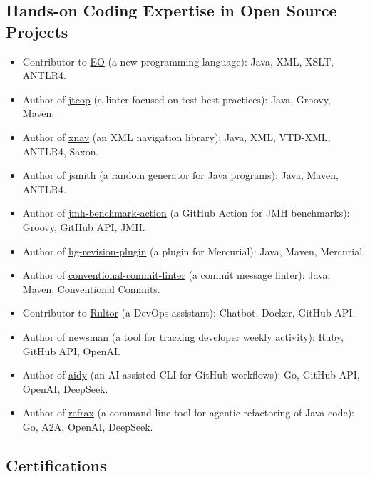 \documentclass{vl}
\begin{document}
\subsection*{Hands-on Coding Expertise in Open Source Projects}
\begin{itemize}
    \itemsep0em
    \item Contributor to \href{https://www.eolang.org}{EO} (a new programming language): Java, XML, XSLT, ANTLR4.
    \item Author of \href{https://github.com/volodya-lombrozo/jtcop}{jtcop} (a linter focused on test best practices): Java, Groovy, Maven.
    \item Author of \href{https://github.com/volodya-lombrozo/xnav}{xnav} (an XML navigation library): Java, XML, VTD-XML, ANTLR4, Saxon.
    \item Author of \href{https://github.com/volodya-lombrozo/jsmith}{jsmith} (a random generator for Java programs): Java, Maven, ANTLR4.
    \item Author of \href{https://github.com/volodya-lombrozo/jmh-benchmark-action}{jmh-benchmark-action} (a GitHub Action for JMH benchmarks): Groovy, GitHub API, JMH.
    \item Author of \href{https://github.com/volodya-lombrozo/hg-revision-plugin}{hg-revision-plugin} (a plugin for Mercurial): Java, Maven, Mercurial.
    \item Author of \href{https://github.com/volodya-lombrozo/conventional-commit-linter}{conventional-commit-linter} (a commit message linter): Java, Maven, Conventional Commits.
    \item Contributor to \href{https://www.rultor.com}{Rultor} (a DevOps assistant): Chatbot, Docker, GitHub API.
    \item Author of \href{https://github.com/volodya-lombrozo/newsman}{newsman} (a tool for tracking developer weekly activity): Ruby, GitHub API, OpenAI.
    \item Author of \href{https://github.com/volodya-lombrozo/aidy}{aidy} (an AI-assisted CLI for GitHub workflows): Go, GitHub API, OpenAI, DeepSeek.
    \item Author of \href{https://github.com/cqfn/refrax}{refrax} (a command-line tool for agentic refactoring of Java code): Go, A2A, OpenAI, DeepSeek.
\end{itemize}

\subsection*{Certifications}
\end{document}
